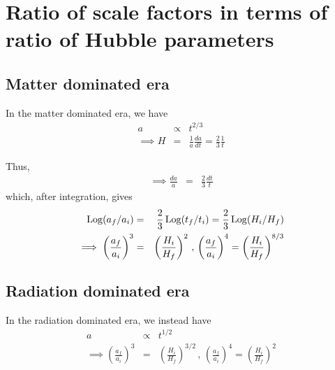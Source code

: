 \documentclass[12pt]{article}
\numberwithin{equation}{section}
\def\bea{\begin{eqnarray}}
\def\eea{\end{eqnarray}}
\begin{document}
\section{Ratio of scale factors in terms of ratio of Hubble parameters}
\label{app-A}

%
%
\subsection{Matter dominated era}
%
%
In the matter dominated era, we have
\bea
a &\propto& t^{2/3} \\
\implies H &=& \frac{1}{a} \frac{da}{dt} = \frac{2}{3} \frac{1}{t} 
\eea

Thus, 
\bea
\implies \frac{da}{a} &=& \frac{2}{3} \frac{dt}{t}
\eea
which, after integration, gives
\bea
{\rm Log} (a_f/a_i) &=& \frac{2}{3} \, {\rm Log} (t_f/t_i) = \frac{2}{3} \, {\rm Log} (H_i/H_f) \\
\implies \left( \frac{a_f}{a_i} \right)^3 &=&  \left( \frac{H_i}{H_f} \right)^2 \, , \,  \left( \frac{a_f}{a_i} \right)^4 =  \left( \frac{H_i}{H_f} \right)^{8/3}
\eea

%
%
\subsection{Radiation dominated era}
%
%
In the radiation dominated era, we instead have
\bea
a &\propto& t^{1/2} \\
\implies \left( \frac{a_f}{a_i} \right)^3 &=&  \left( \frac{H_i}{H_f} \right)^{3/2} \, , \,  \left( \frac{a_f}{a_i} \right)^4 =  \left( \frac{H_i}{H_f} \right)^2
\eea
\end{document}
